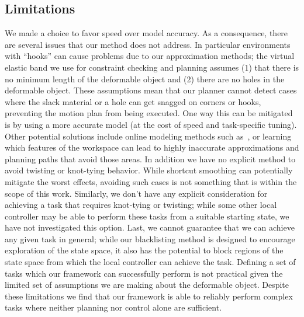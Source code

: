 \subsection{Limitations}
We made a choice to favor speed over model accuracy. As a consequence, there are several issues that our method does not address. In particular environments with ``hooks'' can cause problems due to our approximation methods; the virtual elastic band we use for constraint checking and planning assumes (1) that there is no minimum length of the deformable object and (2) there are no holes in the deformable object. These assumptions mean that our planner cannot detect cases where the slack material or a hole can get snagged on corners or hooks, preventing the motion plan from being executed. One way this can be mitigated is by using a more accurate model (at the cost of speed and task-specific tuning). Other potential solutions include online modeling methods such as~\cite{Hu2018deformable_gpr}, or learning which features of the workspace can lead to highly inaccurate approximations and planning paths that avoid those areas. In addition we have no explicit method to avoid twisting or knot-tying behavior. While shortcut smoothing can potentially mitigate the worst effects, avoiding such cases is not something that is within the scope of this work. Similarly, we don't have any explicit consideration for achieving a task that requires knot-tying or twisting; while some other local controller may be able to perform these tasks from a suitable starting state, we have not investigated this option. Last, we cannot guarantee that we can achieve any given task in general; while our blacklisting method is designed to encourage exploration of the state space, it also has the potential to block regions of the state space from which the local controller can achieve the task. Defining a set of tasks which our framework can successfully perform is not practical given the limited set of assumptions we are making about the deformable object. Despite these limitations we find that our framework is able to reliably perform complex tasks where neither planning nor control alone are sufficient. 
